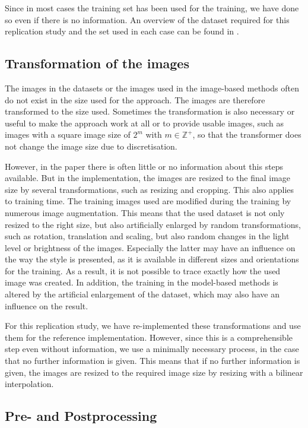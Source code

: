 Since in most cases the training set has been used for the training, we have done so even if there is no information. An overview of the dataset required for this replication study and the set used in each case can be found in .

\subsection{Transformation of the images}

The images in the datasets or the images used in the image-based methods often do not exist in the size used for the approach. The images are therefore transformed to the size used. Sometimes the transformation is also necessary or useful to make the approach work at all or to provide usable images, such as images with a square image size of $2^{m}$ with $ m \in \mathbb{Z}^{+}$, so that the transformer does not change the image size due to discretisation. 

However, in the paper there is often little or no information about this steps available. But in the implementation, the images are resized to the final image size by several transformations, such as resizing and cropping. This also applies to training time. The training images used are modified during the training by numerous image augmentation. This means that the used dataset is not only resized to the right size, but also artificially enlarged by random transformations, such as rotation, translation and scaling, but also random changes in the light level or brightness of the images. Especially the latter may have an influence on the way the style is presented, as it is available in different sizes and orientations for the training. As a result, it is not possible to trace exactly how the used image was created. In addition, the training in the model-based methods is altered by the artificial enlargement of the dataset, which may also have an influence on the result.

For this replication study, we have re-implemented these transformations and use them for the reference implementation. However, since this is a comprehensible step even without information, we use a minimally necessary process, in the case that no further information is given. This means that if no further information is given, the images are resized to the required image size by resizing with a bilinear interpolation.

\subsection{Pre- and Postprocessing}


